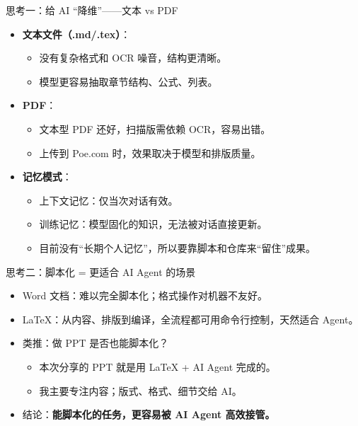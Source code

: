 \documentclass[10pt,aspectratio=169]{beamer}
\begin{document}
\begin{frame}{思考一：给 AI “降维”——文本 vs PDF}
  \begin{itemize}
    \item \textbf{文本文件（.md/.tex）}：
      \begin{itemize}
        \item 没有复杂格式和 OCR 噪音，结构更清晰。
        \item 模型更容易抽取章节结构、公式、列表。
      \end{itemize}
    \item \textbf{PDF}：
      \begin{itemize}
        \item 文本型 PDF 还好，扫描版需依赖 OCR，容易出错。
        \item 上传到 Poe.com 时，效果取决于模型和排版质量。
      \end{itemize}
    \item \textbf{记忆模式}：
      \begin{itemize}
        \item 上下文记忆：仅当次对话有效。
        \item 训练记忆：模型固化的知识，无法被对话直接更新。
        \item 目前没有“长期个人记忆”，所以要靠脚本和仓库来“留住”成果。
      \end{itemize}
  \end{itemize}
\end{frame}

\begin{frame}{思考二：脚本化 = 更适合 AI Agent 的场景}
  \begin{itemize}
    \item Word 文档：难以完全脚本化；格式操作对机器不友好。
    \item LaTeX：从内容、排版到编译，全流程都可用命令行控制，天然适合 Agent。
    \item 类推：做 PPT 是否也能脚本化？
      \begin{itemize}
        \item 本次分享的 PPT 就是用 LaTeX + AI Agent 完成的。
        \item 我主要专注内容；版式、格式、细节交给 AI。
      \end{itemize}
    \item 结论：\textbf{能脚本化的任务，更容易被 AI Agent 高效接管。}
  \end{itemize}
\end{frame}
\end{document}
